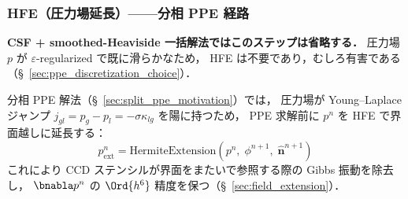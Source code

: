 \subsubsection{HFE（圧力場延長）——分相 PPE 経路}
\label{app:hfe_predictor}

\noindent\textbf{CSF + smoothed-Heaviside 一括解法ではこのステップは省略する．}
圧力場 $p$ が $\varepsilon$-regularized で既に滑らかなため，
HFE は不要であり，むしろ有害である（§~\ref{sec:ppe_discretization_choice}）．

分相 PPE 解法（§~\ref{sec:split_ppe_motivation}）では，
圧力場が Young--Laplace ジャンプ $j_{gl}=p_g-p_l=-\sigma\kappa_{lg}$ を陽に持つため，
PPE 求解前に $p^n$ を HFE で界面越しに延長する：
\[
  p^n_{\mathrm{ext}} = \text{HermiteExtension}(p^n,\; \phi^{n+1},\; \hat{\bm{n}}^{n+1})
\]
これにより CCD ステンシルが界面をまたいで参照する際の Gibbs 振動を除去し，
$\bnabla p^n$ の $\Ord{h^6}$ 精度を保つ（§~\ref{sec:field_extension}）．
